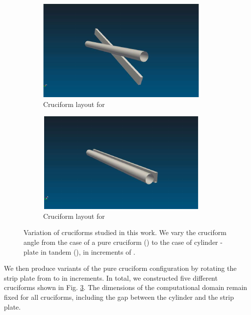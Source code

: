 \documentclass[a4paper,fleqn]{cas-sc}
\begin{document}
\begin{figure}
  \raggedright
  \begin{subfigure}[h]{0.3\textwidth}
    \includegraphics[width=\textwidth]{figs/cruciform225}
    \caption{Cruciform layout for \angtw{}}
    \label{fig:cruciform22.5}
  \end{subfigure}
  \hspace{6mm}
  \begin{subfigure}[h]{0.3\textwidth}
    \includegraphics[width=\textwidth]{figs/cruciform00}
    \caption{Cruciform layout for \angon{}}
    \label{fig:cruciform00}
  \end{subfigure}

  \caption{Variation of cruciforms studied in this work. We vary the cruciform angle from the case of a pure cruciform (\angfi{}) to the case of cylinder - plate in tandem (\angon{}), in increments of \angtw{}.}\label{fig:cruciformLayouts}
\end{figure}

We then produce variants of the pure cruciform configuration by rotating the strip plate from \angfi{} to \angon{} in \angtw{} increments. In total, we constructed five different cruciforms shown in Fig. \ref{fig:cruciformLayouts}. The dimensions of the computational domain remain fixed for all cruciforms, including the gap between the cylinder and the strip plate.
\end{document}
